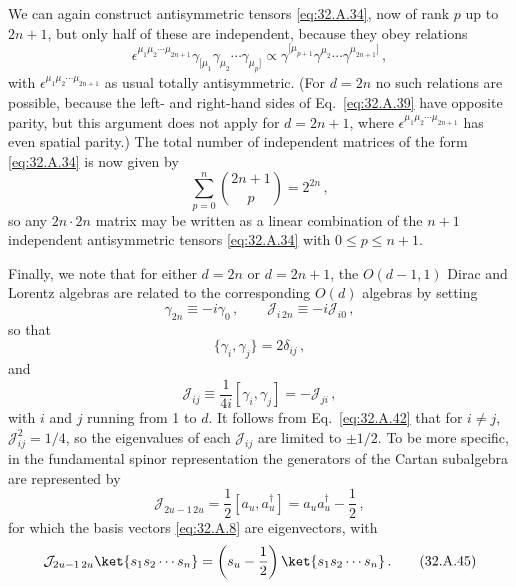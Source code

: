 We can again construct antisymmetric tensors \eqref{eq:32.A.34}, now of rank
\(p\) up to \(2n+1\), but only half of these are independent, because they
obey relations
\begin{equation}
  \epsilon^{\mu_1\mu_2\cdots\mu_{2n+1}}
  \gamma_{[\mu_1}\gamma_{\mu_2}\cdots\gamma_{\mu_p]}
  \propto
  \gamma^{[\mu_{p+1}}\gamma^{\mu_2}\cdots\gamma^{\mu_{2n+1}]}\,,
  \tag{32.A.39}\label{eq:32.A.39}
\end{equation}
with \(\epsilon^{\mu_1\mu_2\cdots\mu_{2n+1}}\) as usual totally
antisymmetric. (For \(d=2n\) no such relations are possible, because the
left- and right-hand sides of Eq.~\eqref{eq:32.A.39} have opposite parity,
but this argument does not apply for \(d=2n+1\), where
\(\epsilon^{\mu_1\mu_2\cdots\mu_{2n+1}}\) has even spatial parity.) The
total number of independent matrices of the form \eqref{eq:32.A.34} is now
given by
\begin{equation}
  \sum_{p=0}^{n}\binom{2n+1}{p}=2^{2n}\,,
  \tag{32.A.40}\label{eq:32.A.40}
\end{equation}
so any \(2n\cdot2n\) matrix may be written as a linear combination of the
\(n+1\) independent antisymmetric tensors \eqref{eq:32.A.34} with
\(0\le p\le n+1\).

Finally, we note that for either \(d=2n\) or \(d=2n+1\), the \(O(d-1,1)\)
Dirac and Lorentz algebras are related to the corresponding \(O(d)\)
algebras by setting
\begin{equation}
  \gamma_{2n}\equiv-i\gamma_0\,,
  \qquad
  \mathcal J_{i\,2n}\equiv-i\mathcal J_{i0}\,,
  \tag{32.A.41}\label{eq:32.A.41}
\end{equation}
so that
\begin{equation}
  \{\gamma_i,\gamma_j\}=2\delta_{ij}\,,
  \tag{32.A.42}\label{eq:32.A.42}
\end{equation}
and
\begin{equation}
  \mathcal J_{ij}
  \equiv\frac{1}{4i}[\gamma_i,\gamma_j]
  =-\mathcal J_{ji}\,,
  \tag{32.A.43}\label{eq:32.A.43}
\end{equation}
with \(i\) and \(j\) running from 1 to \(d\). It follows from
Eq.~\eqref{eq:32.A.42} that for \(i\ne j\),
\(\mathcal J_{ij}^2=1/4\), so the eigenvalues of each \(\mathcal J_{ij}\)
are limited to \(\pm1/2\). To be more specific, in the fundamental spinor
representation the generators of the Cartan subalgebra are represented by
\begin{equation}
  \mathcal J_{2u-1\,2u}
  =\frac{1}{2}[a_u,a_u^\dagger]
  =a_ua_u^\dagger-\frac{1}{2}\,,
  \tag{32.A.44}\label{eq:32.A.44}
\end{equation}
for which the basis vectors \eqref{eq:32.A.8} are eigenvectors, with
\begin{equation}
  \mathcal J_{2u-1\,2u}\ket{s_1s_2\cdots s_n}
  =\left(s_u-\frac{1}{2}\right)\ket{s_1s_2\cdots s_n}\,.
  \tag{32.A.45}\label{eq:32.A.45}
\end{equation}

